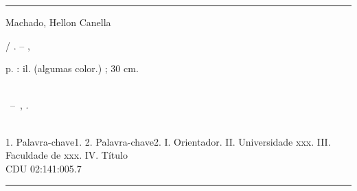 %
%     
\begin{fichacatalografica}
	\vspace*{\fill}					%
	\hrule							%
	\begin{center}					%
	\begin{minipage}[c]{12.5cm}		%
	
	Machado, Hellon Canella
	
	\hspace{0.5cm} \imprimirtitulo  / \imprimirautor. --
	\imprimirlocal, \imprimirdata
	
	\hspace{0.5cm} \pageref{LastPage} p. : il. (algumas color.) ; 30 cm.\\
	
	\hspace{0.5cm} \imprimirorientadorRotulo~\imprimirorientador\\
	
	\hspace{0.5cm}
	\parbox[t]{\textwidth}{\imprimirtipotrabalho~--~\imprimirinstituicao,
	\imprimirdata.}\\
	
	\hspace{0.5cm}
		1. Palavra-chave1.
		2. Palavra-chave2.
		I. Orientador.
		II. Universidade xxx.
		III. Faculdade de xxx.
		IV. Título\\ 			
	
	\hspace{8.75cm} CDU 02:141:005.7\\
	
	\end{minipage}
	\end{center}
	\hrule
\end{fichacatalografica}
